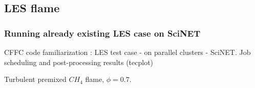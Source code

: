 \documentclass{beamer}
\begin{document}
\subsection{LES flame}
\begin{frame}
\frametitle{Running already existing LES case on SciNET}
\scriptsize
CFFC code familiarization : LES test case - on parallel clusters - SciNET. Job scheduling and post-processing results (tecplot)
\begin{minipage}[t][1\textheight]{1\textwidth}
\vspace{-10pt}
\begin{exampleblock}{Turbulent premixed $CH_4$ flame, $\phi=0.7$. }
\vspace{-20pt}
\begin{figure}
\label{fig:LES}
\centering
{}

\end{figure}
\end{exampleblock}
\end{minipage}
\end{frame}
\end{document}
